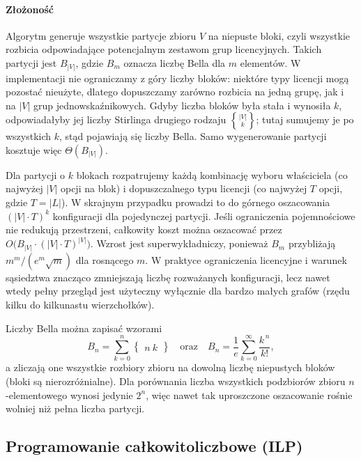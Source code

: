 \paragraph{Złożoność}
Algorytm generuje wszystkie partycje zbioru \(V\) na niepuste bloki, czyli wszystkie rozbicia odpowiadające potencjalnym zestawom grup licencyjnych. Takich partycji jest \(B_{|V|}\), gdzie \(B_m\) oznacza liczbę Bella dla \(m\) elementów. W implementacji nie ograniczamy z góry liczby bloków: niektóre typy licencji mogą pozostać nieużyte, dlatego dopuszczamy zarówno rozbicia na jedną grupę, jak i na \(|V|\) grup jednowskaźnikowych. Gdyby liczba bloków była stała i wynosiła \(k\), odpowiadałyby jej liczby Stirlinga drugiego rodzaju \({|V| \brace k}\); tutaj sumujemy je po wszystkich \(k\), stąd pojawiają się liczby Bella. Samo wygenerowanie partycji kosztuje więc $\Theta(B_{|V|})$.

Dla partycji o \(k\) blokach rozpatrujemy każdą kombinację wyboru właściciela (co najwyżej \(|V|\) opcji na blok) i dopuszczalnego typu licencji (co najwyżej \(T\) opcji, gdzie \(T=|L|\)). W skrajnym przypadku prowadzi to do górnego oszacowania \((|V|\cdot T)^k\) konfiguracji dla pojedynczej partycji. Jeśli ograniczenia pojemnościowe nie redukują przestrzeni, całkowity koszt można oszacować przez \(O\bigl(B_{|V|} \cdot (|V|\cdot T)^{|V|}\bigr)\). Wzrost jest superwykładniczy, ponieważ \(B_m\) przybliżają \({m^{m}}/(e^{m}\sqrt{m})\) dla rosnącego \(m\). W praktyce ograniczenia licencyjne i warunek sąsiedztwa znacząco zmniejszają liczbę rozważanych konfiguracji, lecz nawet wtedy pełny przegląd jest użyteczny wyłącznie dla bardzo małych grafów (rzędu kilku do kilkunastu wierzchołków).

Liczby Bella można zapisać wzorami
\[
  B_n = \sum_{k=0}^{n} \left\{\!\!\begin{array}{c} n \ k \end{array}\!\!\right\}\quad\text{oraz}\quad B_n = \frac{1}{e}\sum_{k=0}^{\infty}\frac{k^{\,n}}{k!},
\]
a zliczają one wszystkie rozbiory zbioru na dowolną liczbę niepustych bloków (bloki są nierozróżnialne). Dla porównania liczba wszystkich podzbiorów zbioru \(n\)-elementowego wynosi jedynie \(2^n\), więc nawet tak uproszczone oszacowanie rośnie wolniej niż pełna liczba partycji.

\subsection{Programowanie całkowitoliczbowe (ILP)}\label{subsec:ilp}

